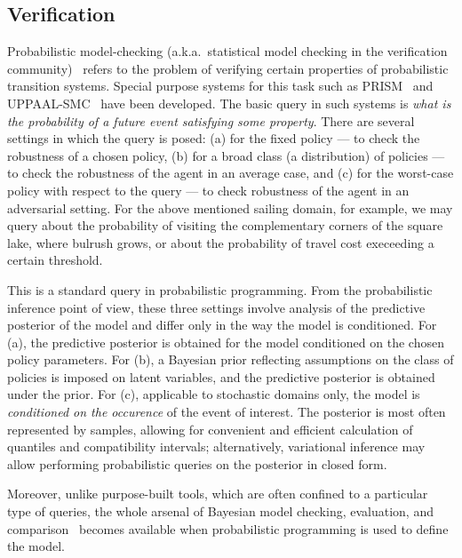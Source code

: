 \documentclass[letterpaper]{article} %
\theoremstyle{definition}
\begin{document}
\subsection{Verification}
Probabilistic model-checking (a.k.a.~statistical model checking
in the verification community)~\cite{SMC} refers to the problem of
verifying certain properties of probabilistic transition systems.
Special purpose systems for this task such as PRISM~\cite{PRISM}
and UPPAAL-SMC~\cite{UPPAAL-SMC} have been developed. %
The basic query in such systems is {\em what is the probability
of a future event satisfying some property}.
There are several settings in which the query is posed: (a) for
the fixed policy --- to check the robustness of a chosen policy,
(b) for a broad class (a distribution) of policies --- to check
the robustness of the agent in an average case, and
(c) for the worst-case policy with respect to the query --- to
check robustness of the agent in an adversarial setting. For
the above mentioned sailing domain, for example, we may query
about the probability of visiting the complementary corners of
the square lake, where bulrush grows, or about the probability
of travel cost execeeding a certain threshold.

This is a standard query in probabilistic programming. From the
probabilistic inference point of view, these three settings
involve analysis of the predictive posterior of the model and
differ only in the way the model is conditioned. For (a), the
predictive posterior is obtained for the model conditioned on
the chosen policy parameters. For (b), a Bayesian prior
reflecting assumptions on the class of policies is imposed on
latent variables, and the predictive posterior is obtained under
the prior. For (c), applicable to stochastic domains only, the
model is \textit{conditioned on the occurence} of the event of
interest.  The posterior is most often represented by samples,
allowing for convenient and efficient calculation of quantiles
and compatibility intervals; alternatively, variational
inference may allow performing probabilistic queries on the
posterior in closed form.

Moreover, unlike  purpose-built tools, which are often confined to
a particular type of queries, the whole arsenal of Bayesian
model checking, evaluation, and comparison~\cite[Chapters
6--7]{gcs+:03} becomes available when probabilistic programming
is used to define the model.
\end{document}

